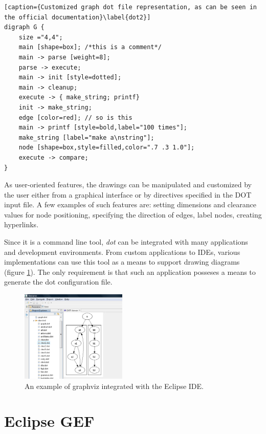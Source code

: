 \begin{lstlisting}[caption={Customized graph dot file representation, as can be seen in the official documentation}\label{dot2}]
digraph G {
	size ="4,4";
	main [shape=box]; /*this is a comment*/
	main -> parse [weight=8];
	parse -> execute;
	main -> init [style=dotted];
	main -> cleanup;
	execute -> { make_string; printf}
	init -> make_string;
	edge [color=red]; // so is this
	main -> printf [style=bold,label="100 times"];
	make_string [label="make a\nstring"];
	node [shape=box,style=filled,color=".7 .3 1.0"];
	execute -> compare;
}
\end{lstlisting}

As user-oriented features, the drawings can be manipulated and customized by the user either from a graphical 
interface or by directives specified in the DOT input file. A few examples of such features are: setting dimensions 
and clearance values for node positioning, specifying the direction of edges, label nodes, creating hyperlinks.

Since it is a command line tool, \emph{dot} can be integrated with many applications and development environments. From 
custom applications to IDEs, various implementations can use this tool as a means to support drawing diagrams (figure \ref{dotide}). The 
only requirement is that such an application posseses a means to generate the dot configuration file.

\begin{figure}[ht] \centering
\includegraphics[width=0.45\textwidth]{img/relatedwork/graphviz.png}
\caption{An example of graphviz integrated with the Eclipse IDE.\protect\footnotemark \label{dotide}} \end{figure}

\section{Eclipse GEF}

